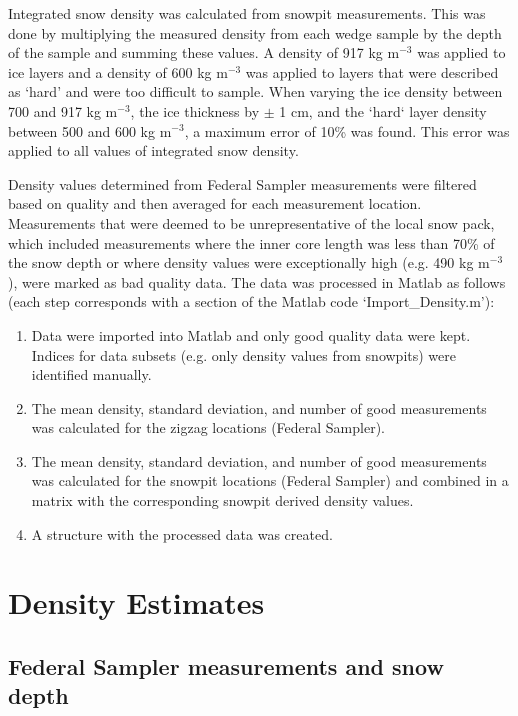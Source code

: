 \documentclass[12pt]{article}
\begin{document}
Integrated snow density was calculated from snowpit measurements. This was done by multiplying the measured density from each wedge sample by the depth of the sample and summing these values. A density of 917 kg m$^{-3}$ was applied to ice layers and a density of 600 kg m$^{-3}$ was applied to layers that were described as `hard' and were too difficult to sample. When varying the ice density between 700 and 917 kg m$^{-3}$, the ice thickness by $\pm$ 1 cm, and the `hard` layer density between 500 and 600 kg m$^{-3}$, a maximum error of 10\% was found. This error was applied to all values of integrated snow density.

Density values determined from Federal Sampler measurements were filtered based on quality and then averaged for each measurement location. Measurements that were deemed to be unrepresentative of the local snow pack, which included measurements where the inner core length was less than 70\% of the snow depth or where density values were exceptionally high (e.g. 490 kg m$^{-3}$), were marked as bad quality data. The data was processed in Matlab as follows (each step corresponds with a section of the Matlab code `Import\_Density.m'): 
\begin{enumerate}
\item Data were imported into Matlab and only good quality data were kept. Indices for data subsets (e.g. only density values from snowpits) were identified manually. 
\item The mean density, standard deviation, and number of good measurements was calculated for the zigzag locations (Federal Sampler).
\item The mean density, standard deviation, and number of good measurements was calculated for the snowpit locations (Federal Sampler) and combined in a matrix with the corresponding snowpit derived density values.
\item A structure with the processed data was created.
\end{enumerate}

\section{Density Estimates}

\subsection*{Federal Sampler measurements and snow depth}
\end{document}
